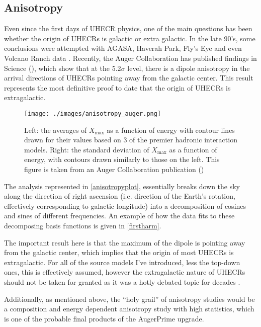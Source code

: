 \subsection{Anisotropy}
Even since the first days of UHECR physics, one of the main questions has been whether the origin of UHECRs is galactic or extra galactic. In the late 90's, some conclusions were attempted with AGASA, Haverah Park, Fly's Eye and even Volcano Ranch data \cite{tds}. Recently, the Auger Collaboration has published findings in Science (\cite{anisotropy}), which show that at the 5.2$\sigma$ level, there is a dipole anisotropy in the arrival directions of UHECRs pointing away from the galactic center. This result represents the most definitive proof to date that the origin of UHECRs is extragalactic. 
\begin{figure}[h!]
\begin{center}
\texttt{[image: ./images/anisotropy\_auger.png]}
\caption{Left: the averages of $X_{\mbox{max}}$ as a function of energy with contour lines drawn for their values based on 3 of the premier hadronic interaction models. Right: the standard deviation of $X_{\mbox{max}}$ as a function of energy, with contours drawn similarly to those on the left. This figure is taken from an Auger Collaboration publication (\cite{anisotropy})}
\label{anisotropyplot}
\end{center}
\end{figure}
The analysis represented in \autoref{anisotropyplot}, essentially breaks down the sky along the direction of right ascension (i.e. direction of the Earth's rotation, effectively corresponding to galactic longitude) into a decomposition of cosines and sines of different frequencies. An example of how the data fits to these decomposing basis functions is given in \autoref{firstharm}.

The important result here is that the maximum of the dipole is pointing away from the galactic center, which implies that the origin of most UHECRs is extragalactic. For all of the source models I've introduced, less the top-down ones, this is effectively assumed, however the extragalactic nature of UHECRs should not be taken for granted as it was a hotly debated topic for decades \cite{hillas,tds}.

Additionally, as mentioned above, the ``holy grail'' of anisotropy studies would be a composition and energy dependent anisotropy study with high statistics, which is one of the probable final products of the AugerPrime upgrade. 

